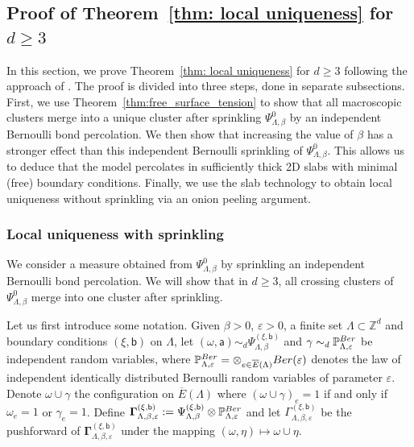 \documentclass[11pt,a4paper]{article}
\theoremstyle{definition}
\numberwithin{equation}{section}
\newcommand\Z{\mathbb{Z}}
\begin{document}
\subsection{Proof of Theorem~\textup{\ref{thm: local uniqueness}} for $d\geq 3$}\label{sec:uniq_d>2}

In this section, we prove Theorem~\textup{\ref{thm: local uniqueness}} for $d\geq 3$ following the approach of \cite{Severo24}. The proof is divided into three steps, done in separate subsections. First, we use Theorem~\ref{thm:free_surface_tension} to show that all macroscopic clusters merge into a unique cluster after sprinkling $\Psi^0_{\Lambda,\beta}$ by an independent Bernoulli bond percolation. We then show that increasing the value of $\beta$ has a stronger effect than this independent Bernoulli sprinkling of $\Psi^0_{\Lambda,\beta}$. This allows us to deduce that the model percolates in sufficiently thick 2D slabs with minimal (free) boundary conditions. Finally, we use the slab technology to obtain local uniqueness without sprinkling via an onion peeling argument. 


\subsubsection{Local uniqueness with sprinkling}

We consider a measure obtained from $\Psi^0_{\Lambda,\beta}$ by sprinkling an independent Bernoulli bond percolation. We will show that in $d\geq 3$, all crossing clusters of $\Psi^0_{\Lambda,\beta}$ merge into one cluster after sprinkling. 

Let us first introduce some notation. Given $\beta>0$, $\varepsilon>0$, a finite set $\Lambda\subset \Z^d$ and boundary conditions $(\xi,\mathsf{b})$ on $\Lambda$, 
let $(\omega,\mathsf{a}) \sim_d \Psi^{(\xi,\mathsf{b})}_{\Lambda,\beta}$ and $\gamma \sim_d \mathbb P^{\rm Ber}_{\Lambda,\varepsilon}$ be independent random variables, where 
$\mathbb P^{\rm Ber}_{\Lambda,\varepsilon}=\otimes_{e\in \overline{E}(\Lambda)} \textrm{Ber}(\varepsilon)$ denotes the law of independent identically distributed Bernoulli random variables of parameter $\varepsilon$. Denote $\omega\cup \gamma$ the configuration on $\overline{E}(\Lambda)$ where $(\omega\cup \gamma)_e=1$ if and only if $\omega_e=1$ or $\gamma_e=1$. Define
${\boldsymbol \Gamma}^{(\xi,\mathsf{b})}_{\Lambda,\beta,\varepsilon}:=\Psi^{(\xi,\mathsf{b})}_{\Lambda,\beta}\otimes \mathbb P^{\rm Ber}_{\Lambda,\varepsilon}$ and let $\Gamma^{(\xi,\mathsf{b})}_{\Lambda,\beta,\varepsilon}$ be the pushforward of ${\boldsymbol \Gamma}^{(\xi,\mathsf{b})}_{\Lambda,\beta,\varepsilon}$ under the mapping $(\omega,\eta)\mapsto \omega\cup \eta$.
\end{document}
